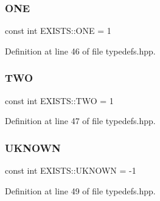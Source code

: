 \mbox{\label{namespace_e_x_i_s_t_s_a4c3717397d716d2bbd69d8239b3de033}} 
\subsubsection{\texorpdfstring{O\+NE}{ONE}}
{\footnotesize\ttfamily const int E\+X\+I\+S\+T\+S\+::\+O\+NE = 1}



Definition at line 46 of file typedefs.\+hpp.

\mbox{\label{namespace_e_x_i_s_t_s_ad76d02e8eb6d20715d333b72394b0648}} 
\subsubsection{\texorpdfstring{T\+WO}{TWO}}
{\footnotesize\ttfamily const int E\+X\+I\+S\+T\+S\+::\+T\+WO = 1}



Definition at line 47 of file typedefs.\+hpp.

\mbox{\label{namespace_e_x_i_s_t_s_a81eb362d951445c658942a433afddb97}} 
\subsubsection{\texorpdfstring{U\+K\+N\+O\+WN}{UKNOWN}}
{\footnotesize\ttfamily const int E\+X\+I\+S\+T\+S\+::\+U\+K\+N\+O\+WN = -\/1}



Definition at line 49 of file typedefs.\+hpp.

